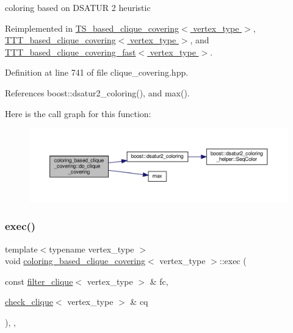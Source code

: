 coloring based on D\+S\+A\+T\+UR 2 heuristic 

Reimplemented in \hyperlink{classTS__based__clique__covering_a06e6693964610f2adff388c8b2febe6f}{T\+S\+\_\+based\+\_\+clique\+\_\+covering$<$ vertex\+\_\+type $>$}, \hyperlink{classTTT__based__clique__covering_af040c67cc904c1a462b3a5efe81a1689}{T\+T\+T\+\_\+based\+\_\+clique\+\_\+covering$<$ vertex\+\_\+type $>$}, and \hyperlink{classTTT__based__clique__covering__fast_a64be6008ee231bbaf326cef4b502e643}{T\+T\+T\+\_\+based\+\_\+clique\+\_\+covering\+\_\+fast$<$ vertex\+\_\+type $>$}.



Definition at line 741 of file clique\+\_\+covering.\+hpp.



References boost\+::dsatur2\+\_\+coloring(), and max().

Here is the call graph for this function\+:
\nopagebreak
\begin{figure}[H]
\begin{center}
\leavevmode
\includegraphics[width=350pt]{dd/d09/classcoloring__based__clique__covering_ab6db4b8e878397afcd5378715d438046_cgraph}
\end{center}
\end{figure}
\mbox{\label{classcoloring__based__clique__covering_aeb77d6c0bdc7d04c9b1dcff7baed450b}} 
\subsubsection{\texorpdfstring{exec()}{exec()}}
{\footnotesize\ttfamily template$<$typename vertex\+\_\+type $>$ \\
void \hyperlink{classcoloring__based__clique__covering}{coloring\+\_\+based\+\_\+clique\+\_\+covering}$<$ vertex\+\_\+type $>$\+::exec (\begin{DoxyParamCaption}\item[{const \hyperlink{structfilter__clique}{filter\+\_\+clique}$<$ vertex\+\_\+type $>$ \&}]{fc,  }\item[{\hyperlink{structcheck__clique}{check\+\_\+clique}$<$ vertex\+\_\+type $>$ \&}]{cq }\end{DoxyParamCaption})\hspace{0.3cm}{\ttfamily [inline]}, {\ttfamily [override]}, {\ttfamily [virtual]}}



